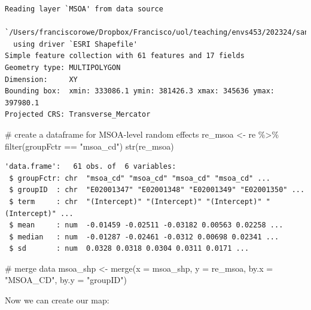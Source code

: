 \documentclass[
  letterpaper,
  DIV=11,
  numbers=noendperiod,
  oneside]{scrreprt}
\newenvironment{Shaded}{\begin{snugshade}}{\end{snugshade}}
\newcommand{\AttributeTok}[1]{\textcolor[rgb]{0.40,0.45,0.13}{#1}}
\newcommand{\CommentTok}[1]{\textcolor[rgb]{0.37,0.37,0.37}{#1}}
\newcommand{\FunctionTok}[1]{\textcolor[rgb]{0.28,0.35,0.67}{#1}}
\newcommand{\NormalTok}[1]{\textcolor[rgb]{0.00,0.23,0.31}{#1}}
\newcommand{\OtherTok}[1]{\textcolor[rgb]{0.00,0.23,0.31}{#1}}
\newcommand{\SpecialCharTok}[1]{\textcolor[rgb]{0.37,0.37,0.37}{#1}}
\newcommand{\StringTok}[1]{\textcolor[rgb]{0.13,0.47,0.30}{#1}}
\begin{document}
\begin{verbatim}
Reading layer `MSOA' from data source 
  `/Users/franciscorowe/Dropbox/Francisco/uol/teaching/envs453/202324/san/data/mlm/MSOA.shp' 
  using driver `ESRI Shapefile'
Simple feature collection with 61 features and 17 fields
Geometry type: MULTIPOLYGON
Dimension:     XY
Bounding box:  xmin: 333086.1 ymin: 381426.3 xmax: 345636 ymax: 397980.1
Projected CRS: Transverse_Mercator
\end{verbatim}

\begin{Shaded}
\begin{Highlighting}[]
\CommentTok{\# create a dataframe for MSOA{-}level random effects}
\NormalTok{re\_msoa }\OtherTok{\textless{}{-}}\NormalTok{ re }\SpecialCharTok{\%\textgreater{}\%} \FunctionTok{filter}\NormalTok{(groupFctr }\SpecialCharTok{==} \StringTok{"msoa\_cd"}\NormalTok{)}
\FunctionTok{str}\NormalTok{(re\_msoa)}
\end{Highlighting}
\end{Shaded}

\begin{verbatim}
'data.frame':   61 obs. of  6 variables:
 $ groupFctr: chr  "msoa_cd" "msoa_cd" "msoa_cd" "msoa_cd" ...
 $ groupID  : chr  "E02001347" "E02001348" "E02001349" "E02001350" ...
 $ term     : chr  "(Intercept)" "(Intercept)" "(Intercept)" "(Intercept)" ...
 $ mean     : num  -0.01459 -0.02511 -0.03182 0.00563 0.02258 ...
 $ median   : num  -0.01287 -0.02461 -0.0312 0.00698 0.02341 ...
 $ sd       : num  0.0328 0.0318 0.0304 0.0311 0.0171 ...
\end{verbatim}

\begin{Shaded}
\begin{Highlighting}[]
\CommentTok{\# merge data}
\NormalTok{msoa\_shp }\OtherTok{\textless{}{-}} \FunctionTok{merge}\NormalTok{(}\AttributeTok{x =}\NormalTok{ msoa\_shp, }\AttributeTok{y =}\NormalTok{ re\_msoa, }\AttributeTok{by.x =} \StringTok{"MSOA\_CD"}\NormalTok{, }\AttributeTok{by.y =} \StringTok{"groupID"}\NormalTok{)}
\end{Highlighting}
\end{Shaded}

Now we can create our map:
\end{document}
